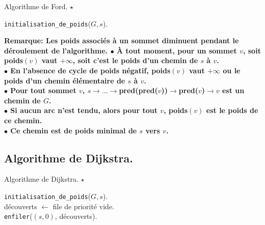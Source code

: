 \documentclass[french, 11pt]{article}
\begin{document}
\vspace*{-0.7cm}

\begin{defi}{Algorithme de Ford. $\star$}{}
    \hspace*{0.28cm}\begin{algorithm}[H]
        \LinesNumbered
        \caption{Algorithme de Ford.}
        \texttt{initialisation\_de\_poids}($G,s$).\\
    \end{algorithm}
    \bf{Remarque:} Les poids associés à un sommet diminuent pendant le déroulement de l'algorithme.\n
    $\bullet$ À tout moment, pour un sommet $v$, soit poids$(v)$ vaut $+\infty$, soit c'est le poids d'un chemin de $s$ à $v$.\\
    $\bullet$ En l'absence de cycle de poids négatif, poids$(v)$ vaut $+\infty$ ou le poids d'un chemin élémentaire de $s$ à $v$.\\
    $\bullet$ Pour tout sommet $v$, $s\to...\to$pred(pred($v$))$\to$pred($v$)$\to v$ est un chemin de $G$.\\
    $\bullet$ Si aucun arc n'est tendu, alors pour tout $v$, poids$(v)$ est le poids de ce chemin.\\
    $\bullet$ Ce chemin est de poids minimal de $s$ vers $v$.
\end{defi}

\subsection{Algorithme de Dijkstra.}

\begin{defi}{Algorithme de Dijkstra. $\star$}{}
    \hspace*{0.28cm}\begin{algorithm}[H]
        \LinesNumbered
        \caption{Algorithme de Dijkstra.}
        \texttt{initialisation\_de\_poids}($G,s$).\\
        découverts $\gets$ file de priorité vide.\\
        \texttt{enfiler}($(s,0)$, découverts).\\
    \end{algorithm}
\end{defi}
\end{document}
